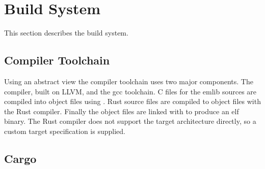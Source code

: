 \section{Build System}
\label{sec:back:build}

This section describes the build system.

\subsection{Compiler Toolchain}
\label{sec:back:build:toolchain}

Using an abstract view the compiler toolchain uses two major components.
The \rustc compiler, built on LLVM, and the  gcc toolchain.
C files for the emlib sources are compiled into object files using \armgcc.
Rust source files are compiled to object files with the Rust compiler.
Finally the object files are linked with \armld to produce an elf binary.
The Rust compiler does not support the target architecture directly, so a custom target specification is supplied.

\subsection{Cargo}
\label{sec:back:build:cargo}

